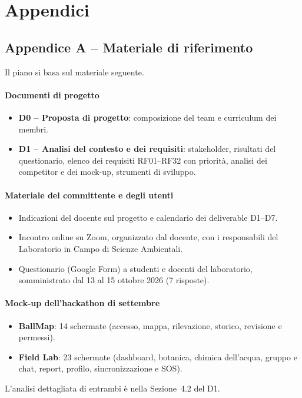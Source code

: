 \section*{Appendici}

\subsection*{Appendice A -- Materiale di riferimento}
Il piano si basa sul materiale seguente.

\paragraph{Documenti di progetto}
\begin{itemize}
    \item \textbf{D0 -- Proposta di progetto}: composizione del team e curriculum dei membri.
    \item \textbf{D1 -- Analisi del contesto e dei requisiti}: stakeholder, risultati del questionario, elenco dei requisiti RF01--RF32 con priorità, analisi dei competitor e dei mock-up, strumenti di sviluppo.
\end{itemize}

\paragraph{Materiale del committente e degli utenti}
\begin{itemize}
    \item Indicazioni del docente sul progetto e calendario dei deliverable D1--D7.
    \item Incontro online su Zoom, organizzato dal docente, con i responsabili del Laboratorio in Campo di Scienze Ambientali.
    \item Questionario (Google Form) a studenti e docenti del laboratorio, somministrato dal 13 al 15 ottobre 2026 (7 risposte).
\end{itemize}

\paragraph{Mock-up dell'hackathon di settembre}
\begin{itemize}
    \item \textbf{BallMap}: 14 schermate (accesso, mappa, rilevazione, storico, revisione e permessi).
    \item \textbf{Field Lab}: 23 schermate (dashboard, botanica, chimica dell'acqua, gruppo e chat, report, profilo, sincronizzazione e SOS).
\end{itemize}
L'analisi dettagliata di entrambi è nella Sezione~4.2 del D1.


